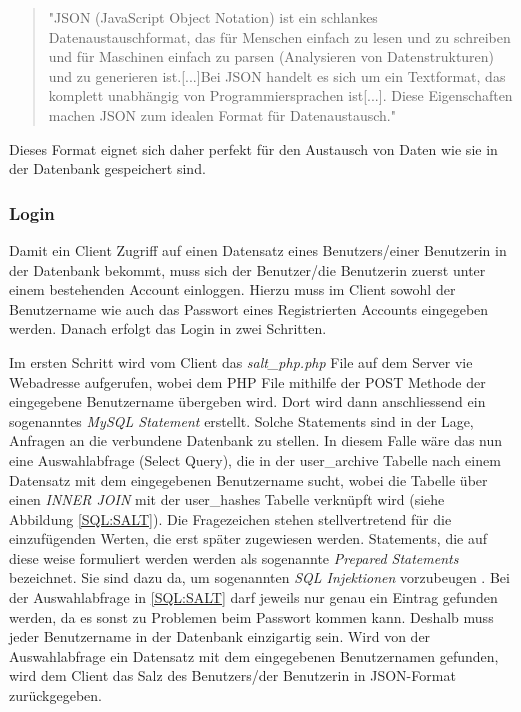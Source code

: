 \documentclass[a4paper,11pt]{report}
\begin{document}
				\begin{quotation}
					"JSON (JavaScript Object Notation) ist ein schlankes Datenaustauschformat, das für Menschen einfach zu lesen und zu schreiben und für Maschinen einfach zu parsen (Analysieren von Datenstrukturen) und zu generieren ist.[...]Bei JSON handelt es sich um ein Textformat, das komplett unabhängig von Programmiersprachen ist[...]. Diese Eigenschaften machen JSON zum idealen Format für Datenaustausch."\cite{JSON}
				\end{quotation}
			
				 Dieses Format eignet sich daher perfekt für den Austausch von Daten wie sie in der Datenbank gespeichert sind.
				
					\subsubsection{Login}\label{login:php}
					Damit ein Client Zugriff auf einen Datensatz eines Benutzers/einer Benutzerin in der Datenbank bekommt, muss sich der Benutzer/die Benutzerin zuerst unter einem bestehenden Account einloggen. Hierzu muss im Client sowohl der Benutzername wie auch das Passwort eines Registrierten Accounts eingegeben werden. Danach erfolgt das Login in zwei Schritten.
					
					Im ersten Schritt wird vom Client das \emph{salt\_php.php} File auf dem Server vie Webadresse aufgerufen, wobei dem PHP File mithilfe der POST Methode der eingegebene Benutzername übergeben wird. Dort wird dann anschliessend ein sogenanntes \emph{MySQL Statement} erstellt. Solche Statements sind in der Lage, Anfragen an die verbundene Datenbank zu stellen. In diesem Falle wäre das nun eine Auswahlabfrage (Select Query), die in der user\_archive Tabelle nach einem Datensatz mit dem eingegebenen Benutzername sucht, wobei die Tabelle über einen \emph{INNER JOIN} mit der user\_hashes Tabelle verknüpft wird (siehe Abbildung \ref{SQL:SALT}). Die Fragezeichen stehen stellvertretend für die einzufügenden Werten, die erst später zugewiesen werden. Statements, die auf diese weise formuliert werden werden als sogenannte \emph{Prepared Statements} bezeichnet. Sie sind dazu da, um sogenannten \emph{SQL Injektionen} vorzubeugen \cite{preparedstatement}. Bei der Auswahlabfrage in \ref{SQL:SALT} darf jeweils nur genau ein Eintrag gefunden werden, da es sonst zu Problemen beim Passwort kommen kann. Deshalb muss jeder Benutzername in der Datenbank einzigartig sein. Wird von der Auswahlabfrage ein Datensatz mit dem eingegebenen Benutzernamen gefunden, wird dem Client das Salz des Benutzers/der Benutzerin in JSON-Format zurückgegeben. 
					
\end{document}
